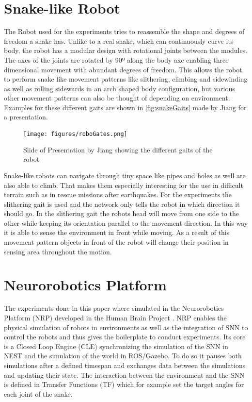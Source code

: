 \section{Snake-like Robot}
The Robot used for the experiments tries to reassemble the shape and degrees of freedom a snake has. Unlike to a real snake, which can continuously curve its body, the robot has a modular design with rotational joints between the modules. The axes of the joints are rotated by 90º along the body axe enabling three dimensional movement with abundant degrees of freedom. This allows the robot to perform snake like movement patterns like slithering, climbing and sidewinding as well as rolling sidewards in an arch shaped body configuration, but various other movement patterns can also be thought of depending on environment. Examples for these different gaits are shown in \autoref{fig:snakeGaits} made by Jiang for a presentation\cite{snakeRobo}.
\newline
\begin{figure}[htpb]
  \centering
  \texttt{[image: figures/roboGates.png]}
  \caption{Slide of Presentation by Jiang showing the different gaits of the robot\cite{snakeRobo}}
  \label{fig:snakeGaits}
\end{figure}
Snake-like robots can navigate through tiny space like pipes and holes as well are also able to climb. That makes them especially interesting for the use in difficult terrain such as in rescue missions after earthquakes.
For the experiments the slithering gait is used and the network only tells the robot in which direction it should go. In the slithering gait the robots head will move from one side to the other while keeping its orientation parallel to the movement direction. In this way it is able to sense the environment in front while moving. As a result of this movement pattern objects in front of the robot will change their position in sensing area throughout the motion.

\section{Neurorobotics Platform}
The experiments done in this paper where simulated in the Neurorobotics Platform (NRP) \cite{nrp} developed in the Human Brain Project \cite{hbp}. NRP enables the physical simulation of robots in environments as well as the integration of SNN to control the robots and thus gives the boilerplate to conduct experiments. Its core is a Closed Loop Engine (CLE) synchronizing the simulation of the SNN in NEST and the simulation of the world in ROS/Gazebo. To do so it pauses both simulations after a defined timespan and exchanges data between the simulations and updating their state. The interaction between the environment and the SNN is defined in Transfer Functions (TF) which for example set the target angles for each joint of the snake.




